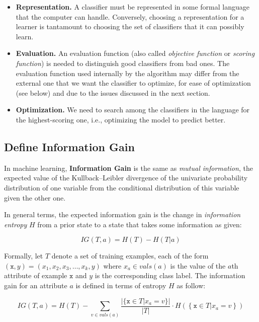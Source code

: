 \documentclass[10pt]{article}
\begin{document}
\begin{itemize}
    \item \textbf{Representation.} A classifier must be represented in some
        formal language that the computer can handle. Conversely, choosing a
        representation for a learner is tantamount to choosing the set of
        classifiers that it can possibly learn.

    \item \textbf{Evaluation.} An evaluation function (also called
        \emph{objective function} or \emph{scoring function}) is needed to
        distinguish good classifiers from bad ones. The evaluation function
        used internally by the algorithm may differ from the external one that
        we want the classifier to optimize, for ease of optimization (see
        below) and due to the issues discussed in the next section.

    \item \textbf{Optimization.} We need to search among the classifiers in the
        language for the highest-scoring one, i.e., optimizing the model to
        predict better.

\end{itemize}

\subsection{Define Information Gain}

In machine learning, \textbf{Information Gain} is the same as \emph{mutual
information}, the expected value of the Kullback–Leibler divergence of the
univariate probability distribution of one variable from the conditional
distribution of this variable given the other one.

In general terms, the expected information gain is the change in
\emph{information entropy} $H$ from a prior state to a state that takes some
information as given:

\begin{equation}
    IG(T,a)=H(T) - H(T | a)
\end{equation}

Formally, let $T$ denote a set of training examples, each of the form
$(\mathtt{x},y)=(x_1,x_2,x_3,\ldots,x_k,y)$ where $x_a \in vals(a)$ is the
value of the $a$th attribute of example $\mathtt{x}$ and $y$ is the
corresponding class label. The information gain for an attribute $a$ is defined
in terms of entropy $H$ as follow:

\begin{equation}
    IG(T,a)=H(T)-\sum_{v \in vals(a)} \frac{|\{\mathtt{x}\in T |
    x_a=v\}|}{|T|}\cdot H\left(\left\{\mathtt{x}\in T | x_a=v\right\}\right)
\end{equation}
\end{document}

